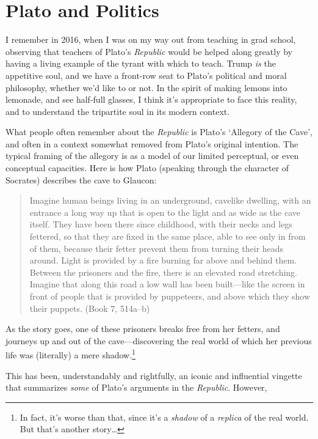 \documentclass[11pt,a4paper,english]{article} %
\begin{document}
    

\section{Plato and Politics}

I remember in 2016, when I was on my way out from teaching in grad school, observing that teachers of Plato's \emph{Republic} would be helped along greatly by having a living example of the tyrant with which to teach. Trump \emph{is} the appetitive soul, and we have a front-row seat to Plato's political and moral philosophy, whether we'd like to or not. In the spirit of making lemons into lemonade, and see half-full glasses, I think it's appropriate to face this reality, and to understand the tripartite soul in its modern context.

What people often remember about the \emph{Republic} is Plato's `Allegory of the Cave', and often in a context somewhat removed from Plato's original intention. The typical framing of the allegory is as a model of our limited perceptual, or even conceptual capacities. Here is how Plato (speaking through the character of Socrates) describes the cave to Glaucon:
\begin{quote}
    Imagine human beings living in an underground, cavelike dwelling, with an entrance a long way up that is open to the light and as wide as the cave itself. They have been there since childhood, with their necks and legs fettered, so that they are fixed in the same place, able to see only in from of them, because their fetter prevent them from turning their heads around. Light is provided by a fire burning far above and behind them. Between the prisoners and the fire, there is an elevated road stretching. Imagine that along this road a low wall has been built---like the screen in front of people that is provided by puppeteers, and above which they show their puppets. (Book 7, 514a--b)
\end{quote}
As the story goes, one of these prisoners breaks free from her fetters, and journeys up and out of the cave---discovering the real world of which her previous life was (literally) a mere shadow.\footnote{In fact, it's worse than that, since it's a \emph{shadow} of a \emph{replica} of the real world. But that's another story\dots}

This has been, understandably and rightfully, an iconic and influential vingette that summarizes \emph{some} of Plato's arguments in the \emph{Republic}. However, 
\end{document}
